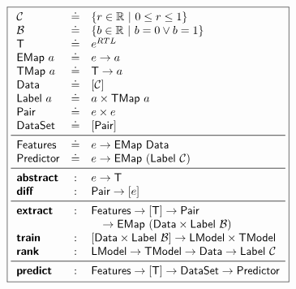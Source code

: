 \begin{figure}
\small
\begin{minipage}[c]{\linewidth}
  \lstDeleteShortInline{|}
  \[
  \boxed{
  \begin{array}{lcl}
    \Conf         & \defeq & \{r \in \R\ |\ 0 \le r \le 1\} \\
    \ConfBin      & \defeq & \{b \in \R\ |\ b = 0 \vee b = 1\} \\
    \T            & \defeq & e^{RTL} \\
    \Emap{a}      & \defeq & e \to a \\
    \Tmap{a}      & \defeq & \T \to a \\
    \datasym      & \defeq & \List{\Conf} \\
    \labelsym{a}  & \defeq & a \times \Tmap{a} \\
    \pairsym      & \defeq & e \times e \\
    \datasetsym   & \defeq & \List{\pairsym} \\
    \midrule
    \featuresym   & \defeq & e \to \Emap{\datasym} \\
    \predictorsym & \defeq & e \to \Emap{(\labelsym{\Conf})} \\
    \midrule
    \abstrsym   & : & e \to \T \\
    \diffsym    & : & \pairsym \to \List{e} \\
    \midrule
    \extractsym & : & \featuresym \to \List{\T} \to \pairsym \\
                &   & \quad \to \Emap{(\datasym \times \labelsym{\ConfBin})} \\
    \trainsym   & : & \List{\datasym \times \labelsym{\ConfBin}} \to \Model \times \ModelT \\
    \ranksym & : & \Model \to \ModelT \to \datasym \to \labelsym{\Conf} \\
    \midrule
    \predictsym  & : & \featuresym \to \List{\T} \to \datasetsym \to \predictorsym \\
  \end{array}
  }
  \]
  \lstMakeShortInline[mathescape=true]{|}
  \label{fig:api}
\end{minipage}
\end{figure}
